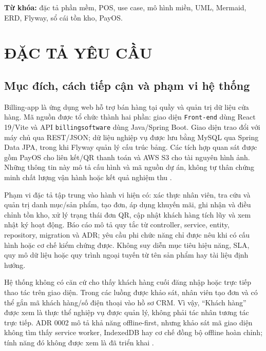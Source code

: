 \documentclass[12pt,a4paper,oneside]{report}
\begin{document}
\noindent\textbf{Từ khóa:} đặc tả phần mềm, POS, use case, mô hình miền, UML, Mermaid, ERD, Flyway, sổ cái tồn kho, PayOS.

\tableofcontents
\listoffigures
\listoftables
\cleardoublepage
{}

\chapter{ĐẶC TẢ YÊU CẦU}

\section{Mục đích, cách tiếp cận và phạm vi hệ thống}
Billing-app là ứng dụng web hỗ trợ bán hàng tại quầy và quản trị dữ liệu cửa hàng. Mã nguồn được tổ chức thành hai phần: giao diện \texttt{Front-end} dùng React 19/Vite và API \texttt{billingsoftware} dùng Java/Spring Boot. Giao diện trao đổi với máy chủ qua REST/JSON; dữ liệu nghiệp vụ được lưu bằng MySQL qua Spring Data JPA, trong khi Flyway quản lý cấu trúc bảng. Các tích hợp quan sát được gồm PayOS cho liên kết/QR thanh toán và AWS S3 cho tài nguyên hình ảnh. Những thông tin này mô tả cấu hình và mã nguồn dự án, không tự thân chứng minh chất lượng vận hành hoặc kết quả nghiệm thu \cite{context,ordercode,schema}.

Phạm vi đặc tả tập trung vào hành vi hiện có: xác thực nhân viên, tra cứu và quản trị danh mục/sản phẩm, tạo đơn, áp dụng khuyến mãi, ghi nhận và điều chỉnh tồn kho, xử lý trạng thái đơn QR, cập nhật khách hàng tích lũy và xem nhật ký hoạt động. Báo cáo mô tả quy tắc từ controller, service, entity, repository, migration và ADR; yêu cầu phi chức năng chỉ được nêu khi có cấu hình hoặc cơ chế kiểm chứng được. Không suy diễn mục tiêu hiệu năng, SLA, quy mô dữ liệu hoặc quy trình ngoại tuyến từ tên sản phẩm hay tài liệu định hướng.

Hệ thống không có căn cứ cho thấy khách hàng cuối đăng nhập hoặc trực tiếp thao tác trên giao diện. Trong các luồng được khảo sát, nhân viên tạo đơn và có thể gắn mã khách hàng/số điện thoại vào hồ sơ CRM. Vì vậy, “Khách hàng” được xem là thực thể nghiệp vụ được quản lý, không phải tác nhân tương tác trực tiếp. ADR 0002 mô tả khả năng offline-first, nhưng khảo sát mã giao diện không tìm thấy service worker, IndexedDB hay cơ chế đồng bộ offline hoàn chỉnh; tính năng đó không được xem là đã triển khai \cite{adr}.
\end{document}
